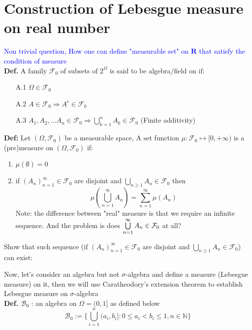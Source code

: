 \newpage
\section{Construction of Lebesgue measure on real number}
\textcolor{blue}{Non trivial question, How one can define "measurable set" on $\mathbf{R}$ that satisfy the condition of measure} \\
\textbf{Def.} A family $\mathcal{F}_0$ of subsets of $2^\Omega$ is said to be algebra/field on if:
\begin{itemize}
    \item[A.1] $\Omega \in \mathcal{F}_0$
    \item[A.2] $A\in \mathcal{F}_0 \Rightarrow A^c \in \mathcal{F}_0$
    \item[A.3] $A_1,A_2,... A_n\in \mathcal{F}_0 \Rightarrow \bigcup\limits_{k=1}^{n}A_k\in \mathcal{F}_0$  \quad\quad  (Finite additivity)
\end{itemize}
\textbf{Def:} Let $(\Omega, \mathcal{F}_0)$ be a measurable space, A set function $\mu: \mathcal{F}_0 \mapsto [0, +\infty)$ is a (pre)measure on $(\Omega, \mathcal{F}_0)$ if:
\begin{enumerate}
    \item $\mu(\emptyset) = 0$
    \item if $(A_n)_{n=1}^{\infty} \in \mathcal{F}_0$ are disjoint  and $\bigcup\limits_{n \geq 1} A_n \in \mathcal{F}_0$ then
    \begin{equation*}
        \mu(\bigcup\limits_{n=1}^{\infty}A_n) = \sum\limits_{n=1}^{\infty}\mu(A_n)
    \end{equation*}
    Note: the difference between "real" measure is that we require an infinite sequence. And the problem is does $\bigcup\limits_{n=1}^{\infty}A_n \in \mathcal{F}_0$ at all?
\end{enumerate}
\begin{ex}
Show that such sequence (if $(A_n)_{n=1}^{\infty} \in \mathcal{F}_0$ are disjoint  and $\bigcup\limits_{n \geq 1} A_n \in \mathcal{F}_0$)  can exist: 
\end{ex}
\newpage
Now, let's consider an algebra but not $\sigma$-algebra and define a measure (Lebesgue measure) on it, then we will use Caratheodory's extension theorem to establish Lebesgue measure on $\sigma$-algebra \\[1cm]
\textbf{Def. $\mathcal{B}_0$} : an algebra on $\Omega = (0,1]$ as defined below
\begin{equation*}
    \mathcal{B}_0:= \{\bigcup\limits_{i=1}^n (a_i, b_i]: 0\leq a_i < b_i \leq 1, n\in \mathbb{N} \}
\end{equation*}
